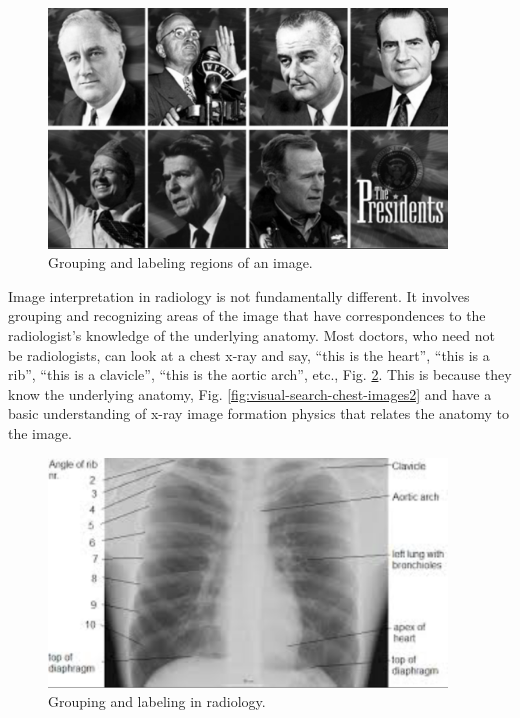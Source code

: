 \documentclass[
]{book}
\begin{document}
\begin{figure}

{\centering \includegraphics[width=300pt]{images/15-visual-search/usPresidents} 

}

\caption{Grouping and labeling regions of an image.}\label{fig:visual-search-us-presidents}
\end{figure}

Image interpretation in radiology is not fundamentally different. It involves grouping and recognizing areas of the image that have correspondences to the radiologist's knowledge of the underlying anatomy. Most doctors, who need not be radiologists, can look at a chest x-ray and say, ``this is the heart'', ``this is a rib'', ``this is a clavicle'', ``this is the aortic arch'', etc., Fig. \ref{fig:visual-search-chest-images1}. This is because they know the underlying anatomy, Fig. \ref{fig:visual-search-chest-images2} and have a basic understanding of x-ray image formation physics that relates the anatomy to the image.

\begin{figure}

{\centering \includegraphics[width=300pt]{images/15-visual-search/chest-imageA} 

}

\caption{Grouping and labeling in radiology.}\label{fig:visual-search-chest-images1}
\end{figure}
\end{document}
